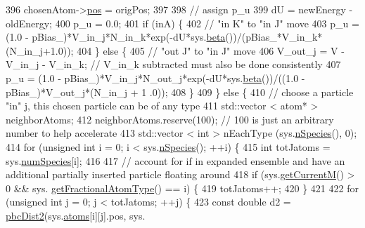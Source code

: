 \begin{DoxyCode}
396             chosenAtom->\hyperlink{classatom_a3ae5f4880e7831d8b2c9fda72b4eb24a}{pos} = origPos;
397 
398             \textcolor{comment}{// assign p\_u}
399             dU = newEnergy - oldEnergy;
400             p\_u =  0.0;
401         \textcolor{keywordflow}{if} (inA) \{
402             \textcolor{comment}{// "in K" to "in J" move}
403             p\_u = (1.0 - pBias\_)*V\_in\_j*N\_in\_k*exp(-dU*sys.\hyperlink{classsim_system_a3eeec9678902f8d7fce4dad6064aaf4c}{beta}())/(pBias\_*V\_in\_k*(N\_in\_j+1.0));
404         \} \textcolor{keywordflow}{else} \{
405             \textcolor{comment}{// "out J" to "in J" move}
406             V\_out\_j = V - V\_in\_j - V\_in\_k; \textcolor{comment}{// V\_in\_k subtracted must also be done consistently}
407             p\_u = (1.0 - pBias\_)*V\_in\_j*N\_out\_j*exp(-dU*sys.\hyperlink{classsim_system_a3eeec9678902f8d7fce4dad6064aaf4c}{beta}())/((1.0 - pBias\_)*V\_out\_j*(N\_in\_j + 1
      .0));
408         \}
409     \} \textcolor{keywordflow}{else} \{
410         \textcolor{comment}{// choose a particle "in" j, this chosen particle can be of any type}
411             std::vector < atom* > neighborAtoms;
412             neighborAtoms.reserve(100); \textcolor{comment}{// 100 is just an arbitrary number to help accelerate}
413             std::vector < int > nEachType (sys.\hyperlink{classsim_system_ab5e2e9b6204de15520302fe1d51688dd}{nSpecies}(), 0);
414         \textcolor{keywordflow}{for} (\textcolor{keywordtype}{unsigned} \textcolor{keywordtype}{int} i = 0; i < sys.\hyperlink{classsim_system_ab5e2e9b6204de15520302fe1d51688dd}{nSpecies}(); ++i) \{
415                     \textcolor{keywordtype}{int} totJatoms = sys.\hyperlink{classsim_system_a9eea865e6dc1cff377b1e79c4d9c23f0}{numSpecies}[i];
416 
417                     \textcolor{comment}{// account for if in expanded ensemble and have an additional partially inserted
       particle floating around}
418                     \textcolor{keywordflow}{if} (sys.\hyperlink{classsim_system_a299fe4372e610b554eaaf5f5957b2dbc}{getCurrentM}() > 0 && sys.
      \hyperlink{classsim_system_a0500a9e84eecfbde7a98cf8a34f719d5}{getFractionalAtomType}() == i) \{
419                         totJatoms++;
420                     \}
421 
422                     \textcolor{keywordflow}{for} (\textcolor{keywordtype}{unsigned} \textcolor{keywordtype}{int} j = 0; j < totJatoms; ++j) \{
423                         \textcolor{keyword}{const} \textcolor{keywordtype}{double} d2 = \hyperlink{utilities_8cpp_abb1db3a8a3ac46e044bbe7b2c5684c0a}{pbcDist2}(sys.\hyperlink{classsim_system_a90421b19082f7fb8fc23b7264b1161e4}{atoms}[i][j].pos, sys.

\end{DoxyCode}
